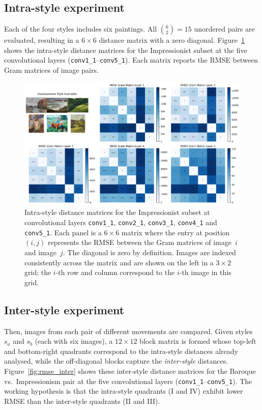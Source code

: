 \documentclass[a4paper,11pt]{article}
\begin{document}
\subsection{Intra-style experiment}
Each of the four styles includes six paintings. All $\binom{6}{2}=15$ unordered pairs are evaluated, resulting in a $6\times6$ distance matrix with a zero diagonal. Figure~\ref{fig:rmse_intra} shows the intra-style distance matrices for the Impressionist subset at the five convolutional layers (\texttt{conv1\_1}–\texttt{conv5\_1}). Each matrix reports the RMSE between Gram matrices of image pairs.

\begin{figure}[ht]
  \centering
  \includegraphics[width=\textwidth]{figures/Impressionism_RMSE.png}
  \caption{Intra-style distance matrices for the Impressionist subset at convolutional layers \texttt{conv1\_1}, \texttt{conv2\_1}, \texttt{conv3\_1}, \texttt{conv4\_1} and \texttt{conv5\_1}. Each panel is a $6\times6$ matrix where the entry at position $(i,j)$ represents the RMSE between the Gram matrices of image~$i$ and image~$j$. The diagonal is zero by definition. Images are indexed consistently across the matrix and are shown on the left in a $3\times2$ grid; the $i$-th row and column correspond to the $i$-th image in this grid.}
  \label{fig:rmse_intra}
\end{figure}

\subsection{Inter-style experiment}
Then, images from each pair of different movements are compared. Given styles \(s_{a}\) and \(s_{b}\) (each with six images), a \(12\times12\) block matrix is formed whose top-left and bottom-right quadrants correspond to the intra-style distances already analysed, while the off-diagonal blocks capture the \emph{inter-style} distances. Figure~\ref{fig:rmse_inter} shows these inter-style distance matrices for the Baroque vs.\ Impressionism pair at the five convolutional layers (\texttt{conv1\_1}–\texttt{conv5\_1}). The working hypothesis is that the intra-style quadrants (I and IV) exhibit lower RMSE than the inter-style quadrants (II and III).
\end{document}
